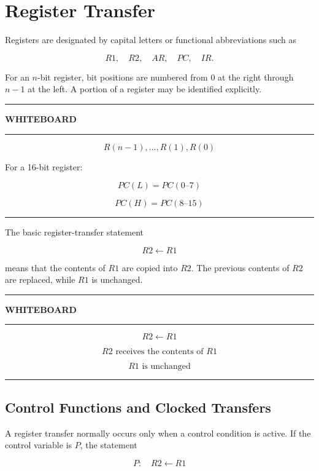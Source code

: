 \documentclass[11pt]{article}
\newenvironment{whiteboard}
{
    \par\medskip
    \hrule
    \vspace{0.35em}
    \noindent\textbf{\large WHITEBOARD}
    \par\vspace{0.3em}
    \hrule
    \vspace{0.65em}
}
{
    \vspace{0.45em}
    \hrule
    \par\medskip
}
\begin{document}
\section{Register Transfer}

Registers are designated by capital letters or functional abbreviations such as

\[
R1,\quad R2,\quad AR,\quad PC,\quad IR.
\]

For an $n$-bit register, bit positions are numbered from $0$ at the right through $n-1$ at the left. A portion of a register may be identified explicitly.

\begin{whiteboard}

\[
R(n-1),\ldots,R(1),R(0)
\]

For a 16-bit register:

\[
\boxed{PC(L)=PC(0\text{--}7)}
\]

\[
\boxed{PC(H)=PC(8\text{--}15)}
\]

\end{whiteboard}

The basic register-transfer statement

\[
R2\leftarrow R1
\]

means that the contents of $R1$ are copied into $R2$. The previous contents of $R2$ are replaced, while $R1$ is unchanged.

\begin{whiteboard}

\[
\boxed{R2\leftarrow R1}
\]

\[
\boxed{R2\text{ receives the contents of }R1}
\]

\[
\boxed{R1\text{ is unchanged}}
\]

\end{whiteboard}

\subsection{Control Functions and Clocked Transfers}

A register transfer normally occurs only when a control condition is active. If the control variable is $P$, the statement

\[
P:\quad R2\leftarrow R1
\]
\end{document}
